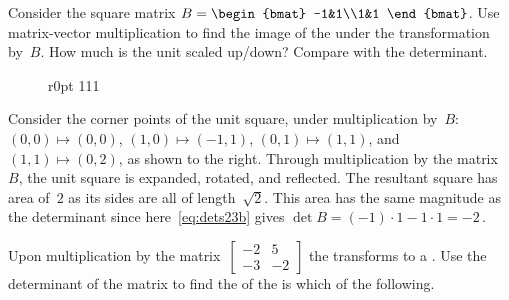 \begin{example} \label{eg:detarea2}
Consider the square matrix \(B=\begin{bmat} -1&1\\1&1 \end{bmat}\).
Use matrix-vector multiplication to find the image of the  under the transformation by~\(B\).
How much is the unit  scaled up/down?  
Compare with the determinant.

\begin{solution} 
\begin{wrapfigure}[6]r{0pt} 111 \end{wrapfigure}
Consider the corner points of the unit square, under multiplication by~\(B\): 
\((0,0)\mapsto(0,0)\)\index{$\mapsto$}, \((1,0)\mapsto(-1,1)\), \((0,1)\mapsto(1,1)\), and \((1,1)\mapsto(0,2)\), as shown to the right.
Through multiplication by the matrix~\(B\), the unit square is expanded, rotated, and reflected.
The resultant square has area of~\(2\) as its sides are all of length~\(\sqrt2\).
This area has the same magnitude as the determinant since here~\eqref{eq:dets23b} gives \(\det B=(-1)\cdot1-1\cdot1=-2\)\,.
\aqed

\end{solution}
\end{example}



\begin{activity}
Upon multiplication by the matrix~\(\begin{bmatrix} -2&5\\-3&-2 \end{bmatrix}\) the  transforms to a .
Use the determinant of the matrix to find the  of the  is which of the following.
\end{activity}



